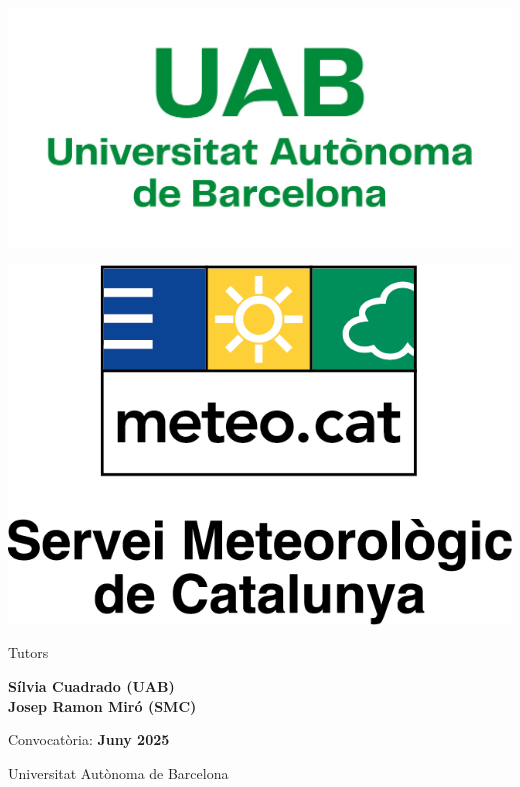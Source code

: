 \documentclass[../main.tex]{subfiles}
\begin{document}
\begin{titlepage}
    \begin{minipage}{0.45\textwidth}
        \centering
        \includegraphics[width=0.9\linewidth]{figures/logos/logo-uab.png}
    \end{minipage}
    \hfill
    \begin{minipage}{0.45\textwidth}
        \centering
        \includegraphics[width=0.9\linewidth]{figures/logos/meteocat_c.png}
    \end{minipage}

    \vfill

    {\large Tutors\par}
    {\large \textbf{Sílvia Cuadrado (UAB) \\ Josep Ramon Miró (SMC)}\par}

    \vspace{1cm}

    {\large Convocatòria: \textbf{Juny 2025}\par}
    {\large Universitat Autònoma de Barcelona}

\end{titlepage}

\end{document}
